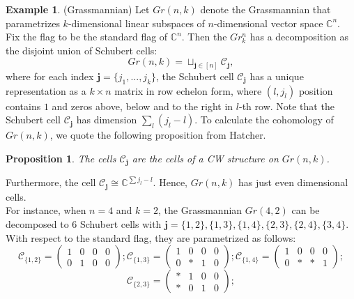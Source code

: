 \documentclass[psamsfonts]{amsart}
\newtheorem{prop}[theorem]{Proposition}
\theoremstyle{definition}
\newtheorem{exmp}[theorem]{Example}
\theoremstyle{remark}
\numberwithin{equation}{section}
\begin{document}
		\begin{exmp}(Grassmannian)
			Let $Gr(n,k)$ denote the Grassmannian that parametrizes $k$-dimensional linear subspaces of $n$-dimensional vector space $\mathbb{C}^n$. Fix the flag to be the standard flag of $\mathbb{C}^n$. Then the $Gr_k^n$ has a decomposition as the disjoint union of Schubert cells:
			\begin{equation}
				Gr(n,k) = \sqcup_{\textbf{j} \in [n]} \mathcal{C}_{\textbf{j}},
			\end{equation}
			where for each index $\textbf{j} = \{   j_1,...,j_k \} $, the Schubert cell $\mathcal{C}_{\textbf{j}}$ has a unique representation as a $k\times n$ matrix in row echelon form, where $(l,j_l)$ position contains $1$ and zeros above, below and to the right in $l$-th row. Note that the Schubert cell $\mathcal{C}_{\textbf{j}}$ has dimension $\sum_l (j_l - l)$. To calculate the cohomology of $Gr(n,k)$, we quote the following proposition from Hatcher.
			\begin{prop}
				The cells $\mathcal{C}_{\textbf{j}}$ are the cells of a CW structure on $Gr(n,k)$.
			\end{prop}
			Furthermore, the cell $\mathcal{C}_{\textbf{j}} \cong \mathbb{C}^{\sum j_l - l}$. Hence, $Gr(n,k)$ has just even dimensional cells.\\
			\indent For instance, when $n=4$ and $k=2$, the Grassmannian $Gr(4,2)$ can be decomposed to 6 Schubert cells with $\textbf{j} = \{1,2\}, \{ 1, 3 \}, \{ 1, 4\}, \{ 2, 3\}, \{2, 4\} ,\{3, 4\}$. With respect to the standard flag, they are parametrized as follows:
			\begin{equation}
				\mathcal{C}_{\{ 1,2\}} = 						\begin{pmatrix}
				1&0&0&0 \\ 0&1&0&0
			\end{pmatrix};
			\mathcal{C}_{\{ 1,3\}} = 						\begin{pmatrix}
				1&0&0&0 \\ 0&*&1&0
			\end{pmatrix};
			\mathcal{C}_{\{ 1,4\}} = 						\begin{pmatrix}
				1&0&0&0 \\ 0&*&*&1
			\end{pmatrix};
			\end{equation}
			\begin{equation}
				\mathcal{C}_{\{ 2,3\}} = 						\begin{pmatrix}
				*&1&0&0 \\ *&0&1&0
			\end{pmatrix};

\end{equation}
\end{exmp}
\end{document}
